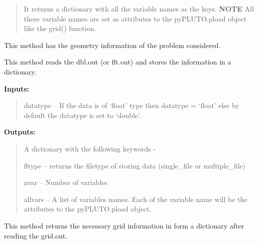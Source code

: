 \documentclass[letterpaper,10pt,english]{sphinxmanual}
\begin{document}
\begin{fulllineitems}
\begin{fulllineitems}
\begin{quote}
It returns a dictionary with all the variable names as the keys. \textbf{NOTE} All these variable names are set as attributes to the pyPLUTO.pload object like the grid() function.
\end{quote}

\end{fulllineitems}


\begin{fulllineitems}
\label{pload:pyPLUTO.pload.geometry}
This method has the geometry information of the problem considered.

\end{fulllineitems}


\begin{fulllineitems}
\label{pload:pyPLUTO.pload.get_varinfo}
This method reads the dbl.out (or flt.out) and stores the information in a dictionary.

\textbf{Inputs:}
\begin{quote}

datatype -- If the data is of `float' type then datatype = `float' else by default the datatype is set to `double'.
\end{quote}

\textbf{Outputs:}
\begin{quote}

A dictionary with the following keywords -

fltype -- returns the filetype of storing data (single\_file or multiple\_file)

nvar -- Number of variables

allvars -- A list of variables names. Each of the variable name will be the attributes to the pyPLUTO.pload object.
\end{quote}

\end{fulllineitems}


\begin{fulllineitems}
\label{pload:pyPLUTO.pload.grid}
This method returns the necessary grid information in form a dictionary after reading the grid.out.


\end{fulllineitems}
\end{fulllineitems}
\end{document}
